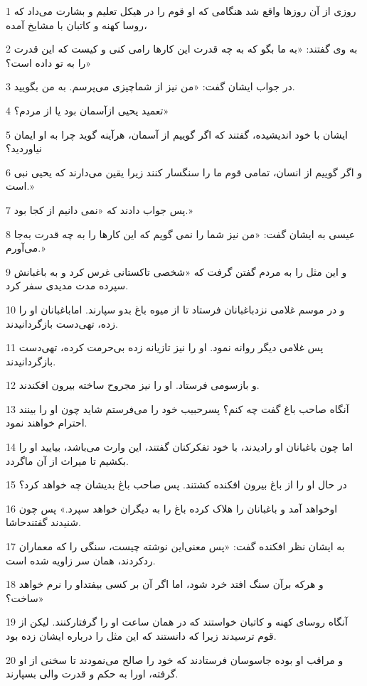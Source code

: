 \par 1 روزی از آن روزها واقع شد هنگامی که او قوم را در هیکل تعلیم و بشارت می‌داد که روسا کهنه و کاتبان با مشایخ آمده،
\par 2 به وی گفتند: «به ما بگو که به چه قدرت این کارها رامی کنی و کیست که این قدرت را به تو داده است؟»
\par 3 در جواب ایشان گفت: «من نیز از شماچیزی می‌پرسم. به من بگویید.
\par 4 تعمید یحیی ازآسمان بود یا از مردم؟»
\par 5 ایشان با خود اندیشیده، گفتند که اگر گوییم از آسمان، هرآینه گوید چرا به او ایمان نیاوردید؟
\par 6 و اگر گوییم از انسان، تمامی قوم ما را سنگسار کنند زیرا یقین می‌دارند که یحیی نبی است.»
\par 7 پس جواب دادند که «نمی دانیم از کجا بود.»
\par 8 عیسی به ایشان گفت: «من نیز شما را نمی گویم که این کارها را به چه قدرت به‌جا می‌آورم.»
\par 9 و این مثل را به مردم گفتن گرفت که «شخصی تاکستانی غرس کرد و به باغبانش سپرده مدت مدیدی سفر کرد.
\par 10 و در موسم غلامی نزدباغبانان فرستاد تا از میوه باغ بدو سپارند. اماباغبانان او را زده، تهی‌دست بازگردانیدند.
\par 11 پس غلامی دیگر روانه نمود. او را نیز تازیانه زده بی‌حرمت کرده، تهی‌دست بازگردانیدند.
\par 12 و بازسومی فرستاد. او را نیز مجروح ساخته بیرون افکندند.
\par 13 آنگاه صاحب باغ گفت چه کنم؟ پسرحبیب خود را می‌فرستم شاید چون او را بینند احترام خواهند نمود.
\par 14 اما چون باغبانان او رادیدند، با خود تفکرکنان گفتند، این وارث می‌باشد، بیایید او را بکشیم تا میراث از آن ماگردد.
\par 15 در حال او را از باغ بیرون افکنده کشتند. پس صاحب باغ بدیشان چه خواهد کرد؟
\par 16 اوخواهد آمد و باغبانان را هلاک کرده باغ را به دیگران خواهد سپرد.» پس چون شنیدند گفتندحاشا.
\par 17 به ایشان نظر افکنده گفت: «پس معنی‌این نوشته چیست، سنگی را که معماران ردکردند، همان سر زاویه شده است.
\par 18 و هر‌که برآن سنگ افتد خرد شود، اما اگر آن بر کسی بیفتداو را نرم خواهد ساخت؟»
\par 19 آنگاه روسای کهنه و کاتبان خواستند که در همان ساعت او را گرفتارکنند. لیکن از قوم ترسیدند زیرا که دانستند که این مثل را درباره ایشان زده بود.
\par 20 و مراقب او بوده جاسوسان فرستادند که خود را صالح می‌نمودند تا سخنی از او گرفته، اورا به حکم و قدرت والی بسپارند.
